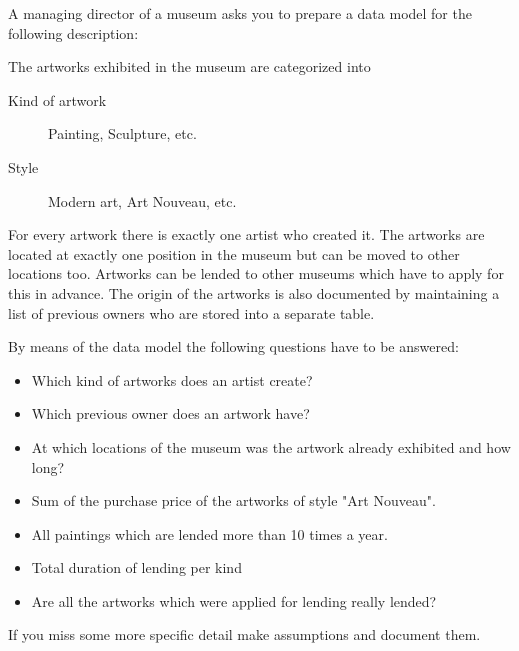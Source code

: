 \documentclass[a4paper,11pt]{exam}
\begin{document}
\begin{center} 
\end{center}
\begin{questions}

A managing director of a museum asks you to prepare a data model for the following description:

The artworks exhibited in the museum are categorized into
\begin{description}
	\item[Kind of artwork] Painting, Sculpture, etc.
	\item [Style] Modern art, Art Nouveau, etc.
\end{description}

For every artwork there is exactly one artist who created it. The artworks are located at exactly one position in the museum but
can be moved to other locations too. Artworks can be lended to other museums which have to apply for this in advance. The
origin of the artworks is also documented by maintaining a list of previous owners who are stored into a separate table.

By means of the data model the following questions have to be answered:
\begin{itemize}
	\item Which kind of artworks does an artist create?
	\item Which previous owner does an artwork have?
	\item At which locations of the museum was the artwork already exhibited and how long?
	\item Sum of the purchase price of the artworks of style "Art Nouveau".
	\item All paintings which are lended more than 10 times a year.
	\item Total duration of lending per kind
	\item Are all the artworks which were applied for lending really lended?
\end{itemize}
If you miss some more specific detail make assumptions and document them.


\end{questions}
\end{document}
